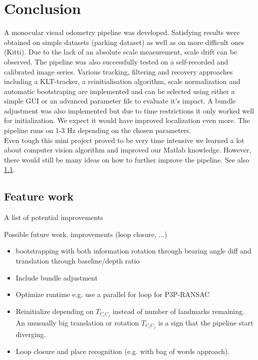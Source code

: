 \section{Conclusion}
A monocular visual odometry pipeline was developed. Satisfying results were obtained on simple datasets (parking dataset) as well as on more difficult ones (Kitti). Due to the lack of an absolute scale measurement, scale drift can be observed. The pipeline was also successfully tested on a self-recorded and calibrated image series. Various tracking, filtering and recovery approaches including a KLT-tracker, a reinitialisation algorithm, scale normalization and automatic bootstraping are implemented and can be selected using either a simple GUI or an advanced parameter file to evaluate it's impact. A bundle adjustment was also implemented but due to time restrictions it only worked well for initialization. We expect it would have improved localization even more. The pipeline runs on 1-3 Hz depending on the chosen parameters.\\

Even tough this mini project proved to be very time intensive we learned a lot about computer vision algorithm and improved our Matlab knowledge. However, there would still be many ideas on how to further improve the pipeline. See also \cref{future}.

\subsection{Feature work}\label{future}
A list of potential improvements

Possible future work, improvements (loop closure, ...)

\begin{itemize}
\item \colorbox[rgb]{1,0,0}{bootstrapping with both information rotation through bearing angle diff and translation through baseline/depth ratio}
\item Include bundle adjustment
\item Optimize runtime e.g. use a parallel for loop for P3P-RANSAC
\item Reinitialize depending on $T_{C_iC_j}$ instead of number of landmarks remaining. An unusually big translation or rotation $T_{C_iC_j}$ is a sign that the pipeline start diverging.
\item Loop closure and place recognition (e.g. with bag of words approach).
\end{itemize}